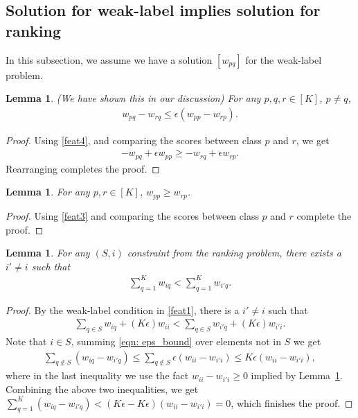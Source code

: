 \documentclass{article}
\newtheorem{lemma}[theorem]{Lemma}
\begin{document}
\subsection{Solution for weak-label implies solution for ranking}
In this subsection, we assume we have a solution $[w_{pq}]$ for the weak-label problem. 
\begin{lemma}
\label{lemma:eps_bound}
(We have shown this in our discussion) For any $p, q, r\in [K]$, $p\neq q$, 
\begin{align}
    w_{pq} - w_{rq} \leq \epsilon(w_{pp}-w_{rp}). \label{eqn: eps_bound}
\end{align}
\end{lemma}
\begin{proof}
    Using \eqref{feat4}, and comparing the scores between class $p$ and $r$, we get 
    \begin{align*}
        -w_{pq} + \epsilon w_{pp} \geq -w_{rq} + \epsilon w_{rp}.
    \end{align*}
    Rearranging completes the proof. 
\end{proof}
\begin{lemma}
\label{lemma:dominant_diag}
For any $p, r\in [K]$, $w_{pp}\geq w_{rp}$. 
\end{lemma}
\begin{proof}
    Using \eqref{feat3} and comparing the scores between class $p$ and $r$ complete the proof. 
\end{proof}
\begin{lemma}
\label{lemma:S constraint}
    For any $(S,i)$ constraint from the ranking problem, there exists a $i'\neq i$ such that 
    \begin{align*}
        \sum_{q=1}^K w_{iq} < \sum_{q=1}^K w_{i'q}. 
    \end{align*}
\end{lemma}
\begin{proof}
    By the weak-label condition in \eqref{feat1}, there is a $i'\neq i$ such that 
    \begin{align*}
        \sum_{q\in S} w_{iq} + (K\epsilon) w_{ii} < \sum_{q\in S} w_{i'q} + (K\epsilon) w_{i'i}. 
    \end{align*}
    Note that $i\in S$, summing \eqref{eqn: eps_bound} over elements not in $S$ we get 
    \begin{align*}
        \sum_{q\notin S} (w_{iq} - w_{i'q}) \leq \sum_{q\notin S} \epsilon (w_{ii}-w_{i'i}) \leq K\epsilon(w_{ii}-w_{i'i}), 
    \end{align*}
    where in the last inequality we use the fact $w_{ii}-w_{i'i}\geq 0$ implied by Lemma~\ref{lemma:dominant_diag}. 
    Combining the above two inequalities, we get $\sum_{q=1}^K (w_{iq}-w_{i'q})<(K\epsilon-K\epsilon)(w_{ii}-w_{i'i})=0$, which finishes the proof. 
\end{proof}
\end{document}
